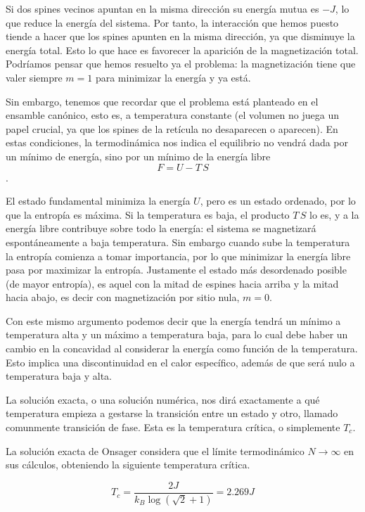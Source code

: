 \documentclass[12pt,a4paper]{article}
\begin{document}
 Si dos spines vecinos apuntan en la misma dirección su energía mutua es $-J$, lo que reduce la energía del sistema. Por tanto, la interacción que hemos puesto tiende a hacer que los spines apunten en la misma dirección, ya que disminuye la energía total. Esto lo que hace es favorecer la aparición de la magnetización total. Podríamos pensar que hemos resuelto ya el problema: la magnetización tiene que valer siempre $m=1$ para minimizar la energía y ya está.

Sin embargo, tenemos que recordar que el problema está planteado en el ensamble canónico, esto es, a temperatura constante (el volumen no juega un papel crucial, ya que los spines de la retícula no desaparecen o aparecen). En estas condiciones, la termodinámica nos indica el equilibrio no vendrá dada por un mínimo de energía, sino por un mínimo de la energía libre \[F=U-T\,S\].

El estado fundamental minimiza la energía $U$, pero es un estado ordenado, por lo que la entropía es máxima. Si la temperatura es baja, el producto $T\,S$ lo es, y a la energía libre contribuye sobre todo la energía: el sistema se magnetizará espontáneamente a baja temperatura. Sin embargo cuando sube la temperatura la entropía comienza a tomar importancia, por lo que minimizar la energía libre pasa por maximizar la entropía. Justamente el estado más desordenado posible (de mayor entropía), es aquel con la mitad de espines hacia arriba y la mitad hacia abajo, es decir con magnetización por sitio nula, $m = 0$. 

Con este mismo argumento podemos decir que la energía tendrá un mínimo a temperatura alta y un máximo a temperatura baja, para lo cual debe haber un cambio en la concavidad al considerar la energía como función de la temperatura. Esto implica una discontinuidad en el calor específico, además de que será nulo a temperatura baja y alta.

La solución exacta, o una solución numérica, nos dirá exactamente a qué temperatura empieza a gestarse la transición entre un estado y otro, llamado comunmente transición de fase. Esta es la temperatura crítica, o simplemente $T_c$.

La solución exacta de Onsager considera que el límite termodinámico $N \to \infty$ en sus cálculos, obteniendo la siguiente temperatura crítica.

\begin{equation}
   T_c=\frac{2J}{k_B\log(\sqrt{2}+1)} = 2.269 J
   \label{eq:t_onsager}
\end{equation}
\end{document}
